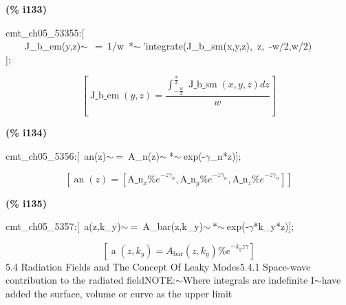 \documentclass[fleqn]{article}
\begin{document}
\noindent
\begin{minipage}[t]{4.000000em}\color{red}\bfseries
(\% i133)	
\end{minipage}
\begin{minipage}[t]{\textwidth}\color{blue}
cmt\_ch05\_53355:[\\
\ \ \ \ J\_b\_em(y,z)\ensuremath{\sim\ }\ =\ 1/w\ *\ensuremath{\sim\ }'integrate(J\_b\_sm(x,y,z),\ z,\ -w/2,w/2)\\
];
\end{minipage}
\[\displaystyle \tag{\% o133} 
\left[ \operatorname{J\_ b\_ em}\left( y\operatorname{,}z\right) =\frac{\int_{-\frac{w}{2}}^{\frac{w}{2}}{\left. \operatorname{J\_ b\_ sm}\left( x\operatorname{,}y\operatorname{,}z\right) dz\right.}}{w}\right] \mbox{}
\]


\noindent
\begin{minipage}[t]{4.000000em}\color{red}\bfseries
(\% i134)	
\end{minipage}
\begin{minipage}[t]{\textwidth}\color{blue}
cmt\_ch05\_5356:[\ an(z)\ensuremath{\sim\ }=\ A\_n(z)\ensuremath{\sim\ }*\ensuremath{\sim\ }exp(-\ensuremath{\gamma}\_n*z)];
\end{minipage}
\[\displaystyle \tag{\% o134} 
\left[ \operatorname{an}(z)=\left[ {{\ensuremath{\mathrm{A\_ n}}}_x} {{\% e}^{-z {{\gamma }_n}}}\operatorname{,}{{\ensuremath{\mathrm{A\_ n}}}_y} {{\% e}^{-z {{\gamma }_n}}}\operatorname{,}{{\ensuremath{\mathrm{A\_ n}}}_z} {{\% e}^{-z {{\gamma }_n}}}\right] \right] \mbox{}
\]


\noindent
\begin{minipage}[t]{4.000000em}\color{red}\bfseries
(\% i135)	
\end{minipage}
\begin{minipage}[t]{\textwidth}\color{blue}
cmt\_ch05\_5357:[\ a(z,k\_y)\ensuremath{\sim\ }=\ A\_bar(z,k\_y)\ensuremath{\sim\ }*\ensuremath{\sim\ }exp(-\ensuremath{\gamma}*k\_y*z)];
\end{minipage}
\[\displaystyle \tag{\% o135} 
\left[ \operatorname{a}\left( z\operatorname{,}{k_y}\right) ={A_{\ensuremath{\mathrm{bar}}}}\left( z\operatorname{,}{k_y}\right)  {{\% e}^{-{k_y} z \gamma }}\right] \mbox{}
\]
5.4         Radiation Fields and The Concept Of Leaky Modes5.4.1   Space-wave contribution to the radiated fieldNOTE:\ensuremath{\sim }Where integrals are indefinite I\ensuremath{\sim }have added the surface, volume or curve as the upper limit
\end{document}
